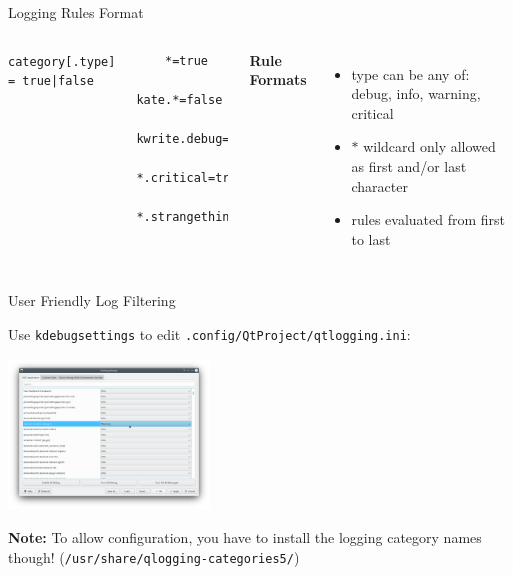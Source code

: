 \documentclass[t,compress,aspectratio=169]{beamer}
\begin{document}
\begin{frame}[fragile]
    {Logging Rules Format}

    \begin{columns}
    \texttt{category[.type] = true|false}
    \medskip

    \begin{minipage}{.95\linewidth}
    \begin{lstlisting}
    *=true
    kate.*=false
    kwrite.debug=true
    *.critical=true
    *.strangethings.*=true
    \end{lstlisting}
    \end{minipage}

    \textbf{Rule Formats}\\
    \begin{itemize}
        \item type can be any of: debug, info, warning, critical
        \item $*$ wildcard only allowed as first and/or last character
        \item rules evaluated from first to last
    \end{itemize}
    \end{columns}
\end{frame}


\begin{frame}
    {User Friendly Log Filtering}

    \vspace{-0.2em}
    Use \texttt{kdebugsettings} to edit \texttt{.config/QtProject/qtlogging.ini}:

    \begin{center}
    \noindent\includegraphics[width=0.4\textwidth]{kdebugsettings.png}
    \end{center}

    \textbf{Note:} To allow configuration, you have to install the logging category names though! (\texttt{/usr/share/qlogging-categories5/})
\end{frame}
\end{document}
